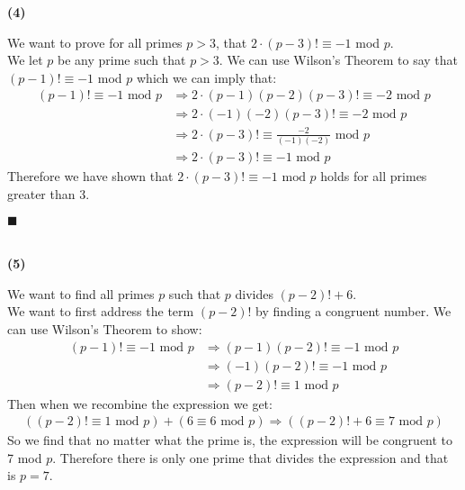 \documentclass[20pt]{article}
\begin{document}
\noindent
\textbf{(4)}
\begin{text}
    We want to prove for all primes $p > 3$, that $2 \cdot (p - 3)! \equiv -1$ mod $p$.\\
    
    \noindent
    We let $p$ be any prime such that $p > 3$. We can use Wilson's Theorem to say that $(p-1)! \equiv -1$ mod $p$ which we can imply that:
    \begin{align}
        (p - 1)! \equiv -1 \text{ mod } p &\Longrightarrow 2 \cdot (p - 1)(p - 2)(p - 3)! \equiv -2 \text{ mod } p\nonumber\\
        &\Longrightarrow 2 \cdot (-1)(-2)(p - 3)! \equiv -2 \text{ mod } p\nonumber\\
        &\Longrightarrow 2 \cdot (p - 3)! \equiv \frac{-2}{(-1)(-2)} \text{ mod } p\nonumber\\
        &\Longrightarrow 2 \cdot (p - 3)! \equiv -1 \text{ mod } p\nonumber
    \end{align}
    \noindent
    Therefore we have shown that $2 \cdot (p - 3)! \equiv -1 \text{ mod } p$ holds for all primes greater than 3.
    
    \hfill $\blacksquare$
\end{text}\\

\noindent
\textbf{(5)}
\begin{text}
    We want to find all primes $p$ such that $p$ divides $(p - 2)! + 6$.\\
    
    \noindent
    We want to first address the term $(p - 2)!$ by finding a congruent number. We can use Wilson's Theorem to show:
    \begin{align}
        (p - 1)! \equiv -1 \text{ mod } p &\Longrightarrow (p - 1)(p - 2)! \equiv -1 \text{ mod } p\nonumber\\
        &\Longrightarrow (-1)(p - 2)! \equiv -1 \text{ mod } p\nonumber\\
        &\Longrightarrow (p - 2)! \equiv 1 \text{ mod } p\nonumber
    \end{align}
    Then when we recombine the expression we get:
    \begin{align}
        ((p - 2)! \equiv 1 \text{ mod } p) + (6 \equiv 6 \text{ mod } p) \Longrightarrow ((p - 2)! + 6 \equiv 7 \text{ mod } p)\nonumber
    \end{align}
    So we find that no matter what the prime is, the expression will be congruent to 7 mod $p$. Therefore there is only one prime that divides the expression and that is $p = 7$.
\end{text}\\
\end{document}
